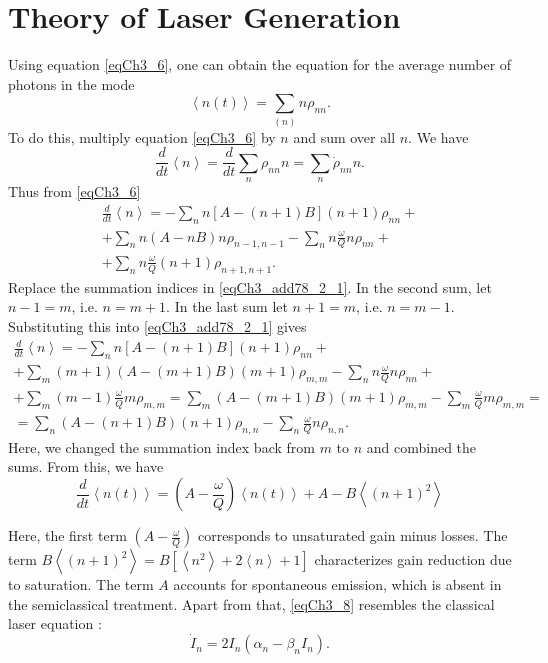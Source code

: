 \section{Theory of Laser Generation}
Using equation \eqref{eqCh3_6}, one can obtain the equation for
the average number of photons in the mode 
\[
\left<n\left(t\right)\right> =\sum_{(n)}n\rho_{nn}.
\]
To do this, multiply equation \eqref{eqCh3_6} by $n$ and
sum over all $n$. We have
\[
\frac{d}{dt}\left<n\right> = \frac{d}{dt}\sum_n\rho_{nn}n = 
\sum_n\dot{\rho}_{nn}n.
\]
Thus from \eqref{eqCh3_6}
\begin{eqnarray}
\frac{d}{dt}\left<n\right> = 
-\sum_n n \left[A - \left(n + 1\right)B\right]\left(n + 1\right)\rho_{nn} +
\nonumber \\
+ \sum_n n\left(A - n B\right)n \rho_{n - 1, n - 1} 
- \sum_n n\frac{\omega}{Q}n \rho_{nn} + 
\nonumber \\
+ \sum_n n \frac{\omega}{Q} \left(n + 1\right)\rho_{n + 1, n + 1}.
\label{eqCh3_add78_2_1}
\end{eqnarray}
Replace the summation indices in \eqref{eqCh3_add78_2_1}. In the second
sum, let $n - 1 = m$, i.e. $n = m + 1$. In the last sum 
let $n + 1 = m$, i.e. $n = m - 1$. Substituting this into
\eqref{eqCh3_add78_2_1} gives
\begin{eqnarray}
\frac{d}{dt}\left<n\right>  = 
-\sum_n n \left[A - \left(n + 1\right)B\right]\left(n + 1\right)\rho_{nn} +
\nonumber \\
+ \sum_m \left(m + 1\right)\left(A - \left(m + 1\right)B\right)\left(m + 1\right) \rho_{m, m} 
- \sum_n n\frac{\omega}{Q}n \rho_{nn} + 
\nonumber \\
+ \sum_m \left(m - 1\right) \frac{\omega}{Q} m\rho_{m, m} = 
\sum_m \left(A - \left(m + 1\right) B\right)\left(m + 1\right) \rho_{m, m} - 
\sum_m \frac{\omega}{Q} m\rho_{m, m} = 
\nonumber \\
= \sum_n \left(A - \left(n + 1\right) B\right)\left(n + 1\right) \rho_{n, n} - 
\sum_n \frac{\omega}{Q} n\rho_{n, n}.
\nonumber
\end{eqnarray}
Here, we changed the summation index back from $m$ to $n$ and combined the sums.
From this, we have
\begin{equation}
\frac{d}{d t}\left<n\left(t\right)\right> = 
\left(A - \frac{\omega}{Q}\right)\left<n\left(t\right)\right>
+ A - B \left<\left(n + 1\right)^2\right>
\label{eqCh3_8}
\end{equation}

Here, the first term $\left(A - \frac{\omega}{Q}\right)$ corresponds to
unsaturated gain minus 
losses. The term 
$B\left<\left(n + 1\right)^2\right> = B \left[\left<n^2\right> + 2
  \left<n\right> + 1\right]$
characterizes gain reduction due to saturation. The term $A$
accounts for spontaneous emission, which is absent in the semiclassical
treatment. Apart from that, \eqref{eqCh3_8} resembles the classical
laser equation \cite{bQuantumOpticsAndRadioPhisicsLecture1966}:
\[
\dot{I}_n = 2 I_n\left(\alpha_n - \beta_n I_n\right).
\]
